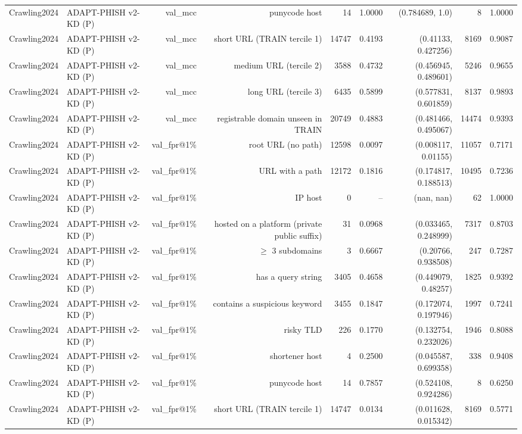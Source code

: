 \begin{table}[t]
\begin{tabular}{llrrrrrrr}
Crawling2024 & ADAPT-PHISH v2-KD (P) & val\_mcc & punycode host & 14 & 1.0000 & (0.784689, 1.0) & 8 & 1.0000 \\
Crawling2024 & ADAPT-PHISH v2-KD (P) & val\_mcc & short URL (TRAIN tercile 1) & 14747 & 0.4193 & (0.41133, 0.427256) & 8169 & 0.9087 \\
Crawling2024 & ADAPT-PHISH v2-KD (P) & val\_mcc & medium URL (tercile 2) & 3588 & 0.4732 & (0.456945, 0.489601) & 5246 & 0.9655 \\
Crawling2024 & ADAPT-PHISH v2-KD (P) & val\_mcc & long URL (tercile 3) & 6435 & 0.5899 & (0.577831, 0.601859) & 8137 & 0.9893 \\
Crawling2024 & ADAPT-PHISH v2-KD (P) & val\_mcc & registrable domain unseen in TRAIN & 20749 & 0.4883 & (0.481466, 0.495067) & 14474 & 0.9393 \\
Crawling2024 & ADAPT-PHISH v2-KD (P) & val\_fpr@1\% & root URL (no path) & 12598 & 0.0097 & (0.008117, 0.01155) & 11057 & 0.7171 \\
Crawling2024 & ADAPT-PHISH v2-KD (P) & val\_fpr@1\% & URL with a path & 12172 & 0.1816 & (0.174817, 0.188513) & 10495 & 0.7236 \\
Crawling2024 & ADAPT-PHISH v2-KD (P) & val\_fpr@1\% & IP host & 0 & -- & (nan, nan) & 62 & 1.0000 \\
Crawling2024 & ADAPT-PHISH v2-KD (P) & val\_fpr@1\% & hosted on a platform (private public suffix) & 31 & 0.0968 & (0.033465, 0.248999) & 7317 & 0.8703 \\
Crawling2024 & ADAPT-PHISH v2-KD (P) & val\_fpr@1\% & $\geq$ 3 subdomains & 3 & 0.6667 & (0.20766, 0.938508) & 247 & 0.7287 \\
Crawling2024 & ADAPT-PHISH v2-KD (P) & val\_fpr@1\% & has a query string & 3405 & 0.4658 & (0.449079, 0.48257) & 1825 & 0.9392 \\
Crawling2024 & ADAPT-PHISH v2-KD (P) & val\_fpr@1\% & contains a suspicious keyword & 3455 & 0.1847 & (0.172074, 0.197946) & 1997 & 0.7241 \\
Crawling2024 & ADAPT-PHISH v2-KD (P) & val\_fpr@1\% & risky TLD & 226 & 0.1770 & (0.132754, 0.232026) & 1946 & 0.8088 \\
Crawling2024 & ADAPT-PHISH v2-KD (P) & val\_fpr@1\% & shortener host & 4 & 0.2500 & (0.045587, 0.699358) & 338 & 0.9408 \\
Crawling2024 & ADAPT-PHISH v2-KD (P) & val\_fpr@1\% & punycode host & 14 & 0.7857 & (0.524108, 0.924286) & 8 & 0.6250 \\
Crawling2024 & ADAPT-PHISH v2-KD (P) & val\_fpr@1\% & short URL (TRAIN tercile 1) & 14747 & 0.0134 & (0.011628, 0.015342) & 8169 & 0.5771 \\

\end{tabular}
\end{table}
